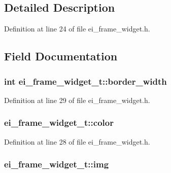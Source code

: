 \subsection{Detailed Description}


Definition at line 24 of file ei\-\_\-frame\-\_\-widget.\-h.



\subsection{Field Documentation}
\hypertarget{structei__frame__widget__t_a3c9f48c109681702db85b9e02a60cd1a}{
\subsubsection[{border\-\_\-width}]{\setlength{\rightskip}{0pt plus 5cm}int ei\-\_\-frame\-\_\-widget\-\_\-t\-::border\-\_\-width}}\label{structei__frame__widget__t_a3c9f48c109681702db85b9e02a60cd1a}


Definition at line 29 of file ei\-\_\-frame\-\_\-widget.\-h.

\hypertarget{structei__frame__widget__t_ad5655f5b5eca009feaa3e1cbe3c0e761}{
\subsubsection[{color}]{ ei\-\_\-frame\-\_\-widget\-\_\-t\-::color}}\label{structei__frame__widget__t_ad5655f5b5eca009feaa3e1cbe3c0e761}


Definition at line 28 of file ei\-\_\-frame\-\_\-widget.\-h.

\hypertarget{structei__frame__widget__t_abd19824f244fc5a498cd9e7df6343a91}{
\subsubsection[{img}]{ ei\-\_\-frame\-\_\-widget\-\_\-t\-::img}}\label{structei__frame__widget__t_abd19824f244fc5a498cd9e7df6343a91}


